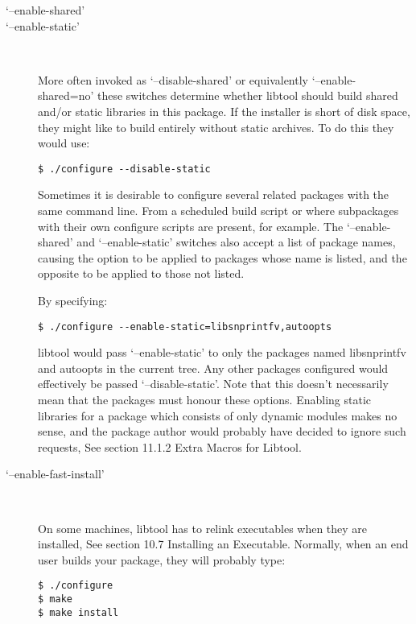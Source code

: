 \begin{description}
\item[`--enable-shared']
\item[`--enable-static']
\ 
%

More often invoked as `--disable-shared' or equivalently `--enable-shared=no' these switches determine whether libtool should build shared and/or static libraries in this package. If the installer is short of disk space, they might like to build entirely without static archives. To do this they would use:

\begin{verbatim}
$ ./configure --disable-static
\end{verbatim}

Sometimes it is desirable to configure several related packages with the same command line. From a scheduled build script or where subpackages with their own configure scripts are present, for example. The `--enable-shared' and `--enable-static' switches also accept a list of package names, causing the option to be applied to packages whose name is listed, and the opposite to be applied to those not listed. 


By specifying: 

\begin{verbatim}
$ ./configure --enable-static=libsnprintfv,autoopts
\end{verbatim}


libtool would pass `--enable-static' to only the packages named libsnprintfv 
and autoopts in the current tree. Any other packages configured would 
effectively be passed `--disable-static'. Note that this doesn't 
necessarily mean that the packages must honour these options. Enabling static 
libraries for a package which consists of only dynamic modules makes no sense,
and the package author would probably have decided to ignore such requests,
See section 11.1.2 Extra Macros for Libtool. 

\item[`--enable-fast-install']
\ 

%
On some machines, libtool has to relink executables when they are installed, See section 10.7 Installing an Executable. Normally, when an end user builds your package, they will probably type:

\begin{Verbatim}[frame=single]
$ ./configure
$ make
$ make install
\end{Verbatim}




\end{description}
